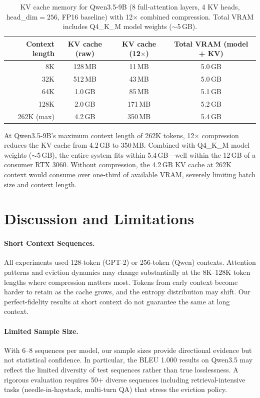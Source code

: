 \documentclass[11pt]{article}
\begin{document}
\begin{table}[htbp]
\centering
\caption{KV cache memory for Qwen3.5-9B (8 full-attention layers, 4 KV heads, head\_dim${}=256$, FP16 baseline) with 12$\times$ combined compression.  Total VRAM includes Q4\_K\_M model weights ($\sim$5\,GB).}
\label{tab:memory}
\begin{tabular}{@{}rccc@{}}
\toprule
Context length & KV cache (raw) & KV cache (12$\times$) & Total VRAM (model + KV) \\
\midrule
8K & 128\,MB & 11\,MB & 5.0\,GB \\
32K & 512\,MB & 43\,MB & 5.0\,GB \\
64K & 1.0\,GB & 85\,MB & 5.1\,GB \\
128K & 2.0\,GB & 171\,MB & 5.2\,GB \\
262K (max) & 4.2\,GB & 350\,MB & 5.4\,GB \\
\bottomrule
\end{tabular}
\end{table}

At Qwen3.5-9B's maximum context length of 262K tokens, 12$\times$ compression reduces the KV cache from 4.2\,GB to 350\,MB.  Combined with Q4\_K\_M model weights ($\sim$5\,GB), the entire system fits within 5.4\,GB---well within the 12\,GB of a consumer RTX 3060.  Without compression, the 4.2\,GB KV cache at 262K context would consume over one-third of available VRAM, severely limiting batch size and context length.

\section{Discussion and Limitations}
\label{sec:discussion}

\paragraph{Short Context Sequences.}
All experiments used 128-token (GPT-2) or 256-token (Qwen) contexts.  Attention patterns and eviction dynamics may change substantially at the 8K--128K token lengths where compression matters most.  Tokens from early context become harder to retain as the cache grows, and the entropy distribution may shift.  Our perfect-fidelity results at short context do not guarantee the same at long context.

\paragraph{Limited Sample Size.}
With 6--8 sequences per model, our sample sizes provide directional evidence but not statistical confidence.  In particular, the BLEU 1.000 results on Qwen3.5 may reflect the limited diversity of test sequences rather than true losslessness.  A rigorous evaluation requires 50+ diverse sequences including retrieval-intensive tasks (needle-in-haystack, multi-turn QA) that stress the eviction policy.
\end{document}
